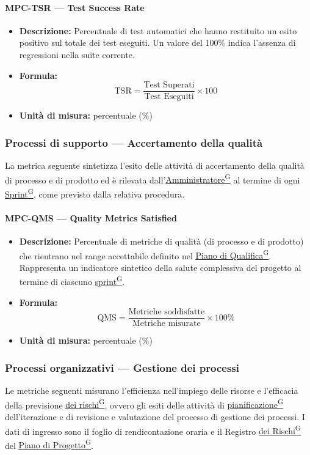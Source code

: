 \documentclass[a4paper,12pt]{article}
\providecommand{\glslink}[2]{\href{https://alittlebyte-19.github.io/Documentazione/glossario.html\#gls-#1}{\underline{#2}\textsuperscript{\scriptsize G}}}
\begin{document}
\paragraph{MPC-TSR --- Test Success Rate}
\begin{itemize}
    \item \textbf{Descrizione:} Percentuale di test automatici che hanno restituito un esito positivo sul totale dei test eseguiti. Un valore del 100\% indica l'assenza di regressioni nella suite corrente.
    \item \textbf{Formula:}
    $$\text{TSR} = \frac{\text{Test Superati}}{\text{Test Eseguiti}} \times 100$$
    \item \textbf{Unità di misura:} percentuale (\%)
\end{itemize}

\subsubsection{Processi di supporto --- Accertamento della qualità}
La metrica seguente sintetizza l'esito delle attività di accertamento della qualità di processo e di prodotto ed è rilevata dall'\glslink{amministratore}{Amministratore} al termine di ogni \glslink{sprint}{Sprint}, come previsto dalla relativa procedura.

\paragraph{MPC-QMS --- Quality Metrics Satisfied}
\begin{itemize}
    \item \textbf{Descrizione:} Percentuale di metriche di qualità (di processo e di prodotto) che rientrano nel range accettabile definito nel \glslink{piano-di-qualifica}{Piano di Qualifica}. Rappresenta un indicatore sintetico della salute complessiva del progetto al termine di ciascuno \glslink{sprint}{sprint}.
    \item \textbf{Formula:}
    $$\text{QMS} = \frac{\text{Metriche soddisfatte}}{\text{Metriche misurate}} \times 100\%$$
    \item \textbf{Unità di misura:} percentuale (\%)
\end{itemize}

\subsubsection{Processi organizzativi --- Gestione dei processi}
Le metriche seguenti misurano l'efficienza nell'impiego delle risorse e l'efficacia della previsione \glslink{mitigazione-dei-rischi}{dei rischi}, ovvero gli esiti delle attività di \glslink{pianificazione}{pianificazione} dell'iterazione e di revisione e valutazione del processo di gestione dei processi. I dati di ingresso sono il foglio di rendicontazione oraria e il Registro \glslink{mitigazione-dei-rischi}{dei Rischi} del \glslink{piano-di-progetto}{Piano di Progetto}.
\end{document}
